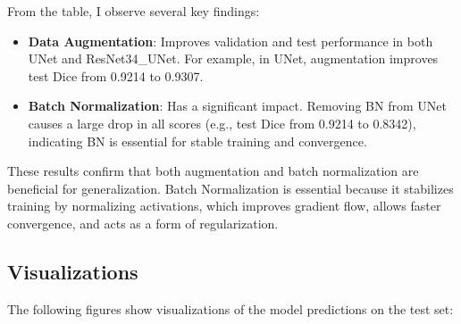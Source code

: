\documentclass{homework}
\begin{document}
From the table, I observe several key findings:

\begin{itemize}
    \item \textbf{Data Augmentation}: Improves validation and test performance in both UNet and ResNet34\_UNet. For example, in UNet, augmentation improves test Dice from 0.9214 to 0.9307.
    \item \textbf{Batch Normalization}: Has a significant impact. Removing BN from UNet causes a large drop in all scores (e.g., test Dice from 0.9214 to 0.8342), indicating BN is essential for stable training and convergence.
\end{itemize}

These results confirm that both augmentation and batch normalization are beneficial for generalization. Batch Normalization is essential because it stabilizes training by normalizing activations, which improves gradient flow, allows faster convergence, and acts as a form of regularization.

\subsection{Visualizations}

The following figures show visualizations of the model predictions on the test set:
\end{document}
